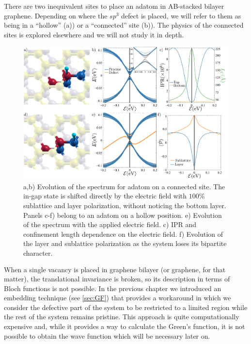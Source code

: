 There are two inequivalent sites to place an adatom in AB-stacked bilayer graphene.
Depending on where the $sp^3$ defect is placed, we will refer to them as being in a ``hollow'' (a)) or a ``connected'' site (b)). The physics of the connected sites is explored elsewhere\cite{Castro2010} and we will not study it in depth.

\begin{figure}[h!]
\centering
\includegraphics{defects/fig/hollow_connected.pdf}
\vspace{-20pt}
\caption{a,b) Evolution of the spectrum for adatom on a connected site. The in-gap state is shifted directly by the electric field with $100\%$ sublattice and layer polarization, without noticing the bottom layer. Panels c-f) belong to an adatom on a hollow position. e) Evolution of the spectrum with the applied electric field. c) IPR and confinement length dependence on the electric field. f) Evolution of the layer and sublattice polarization as the system loses its bipartite character.}
\label{fig:hollow-connected}
\end{figure}

When a single vacancy is placed in graphene bilayer (or graphene, for that matter), the translational invariance is broken, so its description in terms of Bloch functions is not possible. In the previous chapter we introduced an embedding technique (see \ref{sec:GF}) that provides a workaround in which we consider the defective part of the system to be restricted to a limited region while the rest of the system remains pristine.
This approach is quite computationally expensive and, while it provides a way to calculate the Green's function, it is not possible to obtain the wave function which will be necessary later on.

